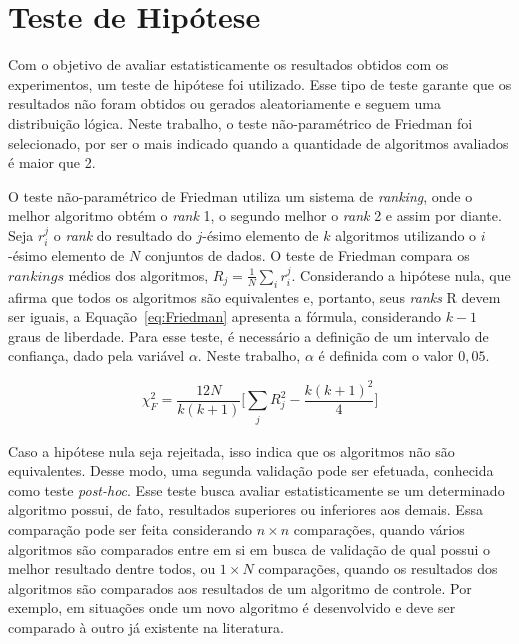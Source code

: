 \section{Teste de Hipótese}\label{sec:testeHipotese}

Com o objetivo de avaliar estatisticamente os resultados obtidos com os experimentos, um teste de hipótese foi utilizado. Esse tipo de teste garante  que os resultados não foram obtidos ou gerados aleatoriamente e seguem uma distribuição lógica. Neste trabalho, o teste não-paramétrico de Friedman \cite{Demsar2006} foi selecionado, por ser o mais indicado quando a quantidade de algoritmos avaliados é maior que 2.

O teste não-paramétrico de Friedman utiliza um sistema de \textit{ranking}, onde o melhor algoritmo obtém o \textit{rank} 1, o segundo melhor o \textit{rank} 2 e assim por diante. Seja $r^{j}_i$ o \textit{rank} do resultado do $j$-ésimo elemento de $k$ algoritmos utilizando o $i$-ésimo elemento de $N$ conjuntos de dados. O teste de Friedman compara os $rankings$ médios dos algoritmos, $R_j = \frac{1}{N} \sum_{i} r^{j}_i$. Considerando a hipótese nula, que afirma que todos os algoritmos são equivalentes e, portanto, seus \textit{ranks} R devem ser iguais, a Equação~\ref{eq:Friedman} apresenta a fórmula, considerando $k - 1$ graus de liberdade. Para esse teste, é necessário a definição de um intervalo de confiança, dado pela variável $\alpha$. Neste trabalho, $\alpha$ é definida com o valor $0,05$.

\begin{equation}\label{eq:Friedman}
\chi^{2}_{F} = \frac{12N}{k(k+1)} \Big[  \sum_{\substack{j}} R^{2}_{j} - \frac{k(k+1)^{2}}{4}\Big]
\end{equation}

Caso a hipótese nula seja rejeitada, isso indica que os algoritmos não são equivalentes. Desse modo, uma segunda validação pode ser efetuada, conhecida como teste \textit{post-hoc}. Esse teste busca avaliar estatisticamente se um determinado algoritmo possui, de fato, resultados superiores ou inferiores aos demais. Essa comparação pode ser feita considerando $n \times n $ comparações, quando vários algoritmos são comparados entre em si em busca de validação de qual possui o melhor resultado dentre todos,  ou $1 \times N$ comparações, quando os resultados dos algoritmos são comparados aos resultados de um algoritmo de controle. Por exemplo, em situações onde um novo algoritmo é desenvolvido e deve ser comparado à outro já existente na literatura.

